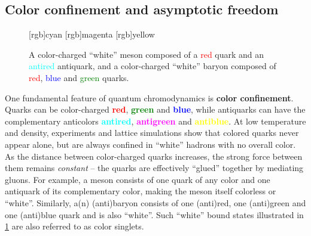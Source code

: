 \subsection*{Color confinement and asymptotic freedom}

\begin{figure}[t]
\centering
{}
[rgb]{cyan}
[rgb]{magenta}
[rgb]{yellow}
\caption{\label{fig:qcd:colorless_hadrons}%
	A color-charged ``white'' meson composed of a \textcolor{red}{red} quark and an \textcolor{cyan}{antired} antiquark, and
	a color-charged ``white'' baryon composed of \textcolor{red}{red}, \textcolor{blue}{blue} and \textcolor{green}{green} quarks.
}
\end{figure}

One fundamental feature of quantum chromodynamics is \textbf{color confinement}.
Quarks can be color-charged \textcolor{red}{\textbf{red}}, \textcolor{green}{\textbf{green}} and \textcolor{blue}{\textbf{blue}},
while antiquarks can have the complementary anticolors \textcolor{cyan}{\textbf{antired}}, \textcolor{magenta}{\textbf{antigreen}} and \textcolor{yellow}{\textbf{antiblue}}.
At low temperature and density, experiments and lattice simulations show that colored quarks never appear alone, but are always confined in ``white'' hadrons with no overall color.
As the distance between color-charged quarks increases, the strong force between them remains \emph{constant} -- the quarks are  effectively ``glued'' together by mediating gluons.
For example, a meson consists of one quark of any color and one antiquark of its complementary color, making the meson itself colorless or ``white''.
Similarly, a(n) (anti)baryon consists of one (anti)red, one (anti)green and one (anti)blue quark and is also ``white''.
Such ``white'' bound states illustrated in \cref{fig:qcd:colorless_hadrons} are also referred to as color singlets.


